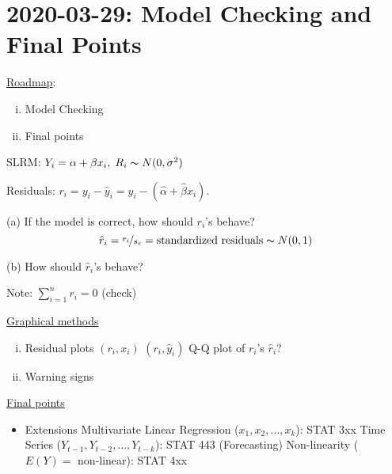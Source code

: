 \section{2020-03-29: Model Checking and Final Points}
\underline{Roadmap}:
\begin{enumerate}[(i)]
    \item Model Checking
    \item Final points
\end{enumerate}
SLRM: $ Y_i = \alpha+\beta x_i,\; R_i \thicksim N(0,\sigma^2) $

Residuals: $ r_i=y_i-\hat{y}_i=y_i-(\hat{\alpha}+\hat{\beta}x_i) $.

(a) If the model is correct, how should $ r_i $'s behave?
\[ \hat{r}_i=\nicefrac{r_i}{s_e}=\text{standardized residuals}
    \thicksim N(0,1) \]

(b) How should $ \hat{r}_i $'s behave?

Note: $ \sum\limits_{i=1}^{n} r_i=0 $ (check)

\underline{Graphical methods}
\begin{enumerate}[(i)]
    \item Residual plots
          \subitem $ (r_i,x_i) $
          \subitem $ (r_i,\hat{y}_i) $
          \subitem Q-Q plot of $ r_i $'s
          \subitem $ \hat{r}_i $?
    \item Warning signs
\end{enumerate}
\underline{Final points}
\begin{itemize}
    \item Extensions
          \subitem Multivariate Linear Regression ($ x_1,x_2,\ldots ,x_k $): STAT 3xx
          \subitem Time Series ($ Y_{t-1},Y_{t-2},\ldots ,Y_{t-k} $): STAT 443 (Forecasting)
          \subitem Non-linearity ($ E(Y)= $ non-linear): STAT 4xx
\end{itemize}
